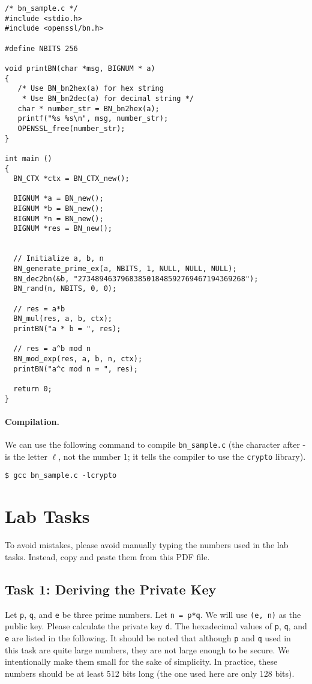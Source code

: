 \begin{lstlisting}
/* bn_sample.c */
#include <stdio.h>
#include <openssl/bn.h>

#define NBITS 256

void printBN(char *msg, BIGNUM * a)
{
   /* Use BN_bn2hex(a) for hex string
    * Use BN_bn2dec(a) for decimal string */
   char * number_str = BN_bn2hex(a);
   printf("%s %s\n", msg, number_str);
   OPENSSL_free(number_str);
}

int main ()
{
  BN_CTX *ctx = BN_CTX_new();

  BIGNUM *a = BN_new();
  BIGNUM *b = BN_new();
  BIGNUM *n = BN_new();
  BIGNUM *res = BN_new();


  // Initialize a, b, n
  BN_generate_prime_ex(a, NBITS, 1, NULL, NULL, NULL);
  BN_dec2bn(&b, "273489463796838501848592769467194369268");
  BN_rand(n, NBITS, 0, 0);

  // res = a*b
  BN_mul(res, a, b, ctx);
  printBN("a * b = ", res);

  // res = a^b mod n
  BN_mod_exp(res, a, b, n, ctx);
  printBN("a^c mod n = ", res);

  return 0;
}
\end{lstlisting}
 


\paragraph{Compilation.} We can use the following command to
compile \texttt{bn\_sample.c} (the
character after - is the letter $\ell$, not the number 1; it tells the compiler to use the
\texttt{crypto} library).

\begin{lstlisting}
$ gcc bn_sample.c -lcrypto
\end{lstlisting}
 


\section{Lab Tasks}


To avoid mistakes, please avoid manually typing the numbers used in the lab tasks. 
Instead, copy and paste them from this PDF file. 


\subsection{Task 1: Deriving the Private Key}

Let \texttt{p}, \texttt{q}, and \texttt{e} be three prime numbers. Let \texttt{n = p*q}. 
We will use \texttt{(e, n)} as the public key. Please calculate the private key \texttt{d}.
The hexadecimal values of \texttt{p}, \texttt{q}, and \texttt{e} are listed in the following. It should be 
noted that although \texttt{p} and \texttt{q} used in this task are quite large numbers, they are not large
enough to be secure. We intentionally make them small for the sake of simplicity. In practice,
these numbers should be at least 512 bits long (the one used here are only 128 bits).

